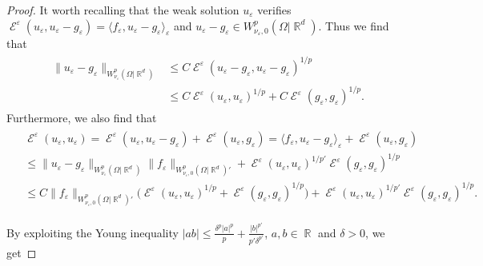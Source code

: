 \documentclass[12pt, reqno]{amsart}%
\theoremstyle{plain}  %
\theoremstyle{definition}  %
\numberwithin{equation}{section}
\DeclareMathOperator{\cE}{\mathcal{E}}
\DeclareMathOperator{\R}{\mathbb{R}}
\newcommand{\eps}{\varepsilon}
\newcommand{\WnuOmRa}{W^p_{\nu_\eps}(\Omega|\R^d )}
\newcommand{\WnuOmRao}{W^p_{\nu_\eps,0}(\Omega|\R^d)}
\begin{document}
\begin{proof}
\noindent It worth recalling that the weak solution  $u_\eps$  verifies  $\cE^\eps(u_\eps,u_\eps-g_\eps)=  \langle f_\eps , u_\eps-g_\eps \rangle_\eps$ and $ u_\eps-g_\eps\in \WnuOmRao$. Thus we find that
%
\begin{align*}
\begin{split}
\| u_\eps-g_\eps \|_{\WnuOmRa}
&\leq C \cE^\eps(u_\eps-g_\eps,u_\eps-g_\eps)^{1/p}\\
&	\leq C\cE^\eps(u_\eps,u_\eps)^{1/p}+ C\cE^\eps(g_\eps,g_\eps)^{1/p}.
\end{split}
\end{align*}
Furthermore, we also find that
%
\begin{align*}
\begin{split}
&\cE^\eps(u_\eps,u_\eps)
= \cE^\eps(u_\eps,u_\eps-g_\eps) +\cE^\eps(u_\eps,g_\eps)= \langle f_\eps , u_\eps-g_\eps \rangle_\eps +\cE^\eps(u_\eps,g_\eps)\\
&\leq \| u_\eps-g_\eps \|_{\WnuOmRa} \|f_\eps\|_{\WnuOmRao'}+\cE^\eps(u_\eps,u_\eps)^{1/p'}\cE^\eps(g_\eps,g_\eps)^{1/p}\\
&\leq  C \|f_\eps\|_{\WnuOmRao'}\big(
\cE^\eps(u_\eps,u_\eps)^{1/p}+\cE^\eps(g_\eps,g_\eps)^{1/p}\big)
+\cE^\eps(u_\eps,u_\eps)^{1/p'}\cE^\eps(g_\eps,g_\eps)^{1/p}.
\end{split}
\end{align*}

\noindent By exploiting the Young inequality $	|ab|\leq \frac{\delta^p |a|^p}{p}+ \frac{|b|^{p'}}{p'\delta^{p'}} $, $a,b\in \R$ and $\delta>0$,  we get


\end{proof}
\end{document}
